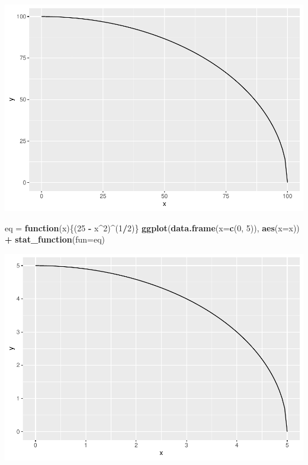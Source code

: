 \documentclass[
]{article}
\newenvironment{Shaded}{\begin{snugshade}}{\end{snugshade}}
\newcommand{\ControlFlowTok}[1]{\textcolor[rgb]{0.13,0.29,0.53}{\textbf{#1}}}
\newcommand{\DataTypeTok}[1]{\textcolor[rgb]{0.13,0.29,0.53}{#1}}
\newcommand{\DecValTok}[1]{\textcolor[rgb]{0.00,0.00,0.81}{#1}}
\newcommand{\KeywordTok}[1]{\textcolor[rgb]{0.13,0.29,0.53}{\textbf{#1}}}
\newcommand{\NormalTok}[1]{#1}
\newcommand{\OperatorTok}[1]{\textcolor[rgb]{0.81,0.36,0.00}{\textbf{#1}}}
\newcommand{\StringTok}[1]{\textcolor[rgb]{0.31,0.60,0.02}{#1}}
\begin{document}
\includegraphics{Orga-Industrial_files/figure-latex/cars-1.pdf}

\begin{Shaded}
\begin{Highlighting}[]
\NormalTok{eq =}\StringTok{ }\ControlFlowTok{function}\NormalTok{(x)\{(}\DecValTok{25} \OperatorTok{-}\StringTok{ }\NormalTok{x}\OperatorTok{^}\DecValTok{2}\NormalTok{)}\OperatorTok{^}\NormalTok{(}\DecValTok{1}\OperatorTok{/}\DecValTok{2}\NormalTok{)\}}
\KeywordTok{ggplot}\NormalTok{(}\KeywordTok{data.frame}\NormalTok{(}\DataTypeTok{x=}\KeywordTok{c}\NormalTok{(}\DecValTok{0}\NormalTok{, }\DecValTok{5}\NormalTok{)), }\KeywordTok{aes}\NormalTok{(}\DataTypeTok{x=}\NormalTok{x)) }\OperatorTok{+}\StringTok{ }
\StringTok{  }\KeywordTok{stat_function}\NormalTok{(}\DataTypeTok{fun=}\NormalTok{eq)}
\end{Highlighting}
\end{Shaded}

\includegraphics{Orga-Industrial_files/figure-latex/cars-2.pdf}
\end{document}
